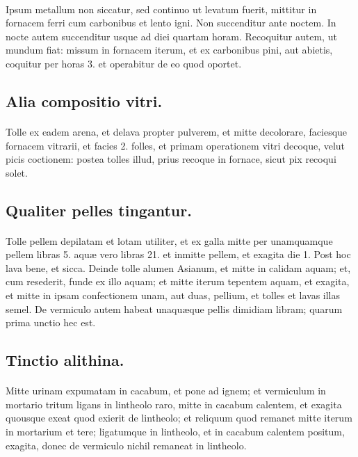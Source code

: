 \documentclass[a4paper, 11pt, oneside, polutonikogreek, italian]{article}
\begin{document}
\paragraph{}
Ipsum metallum non siccatur, sed continuo ut levatum fuerit, mittitur in fornacem ferri cum carbonibus et lento igni. Non succenditur ante noctem. In nocte autem succenditur usque ad diei quartam horam. Recoquitur autem, ut mundum fiat: missum in fornacem iterum, et ex carbonibus pini, aut abietis, coquitur per horas 3. et operabitur de eo quod oportet.

\subsection{Alia compositio vitri.}
\paragraph{}
Tolle ex eadem arena, et delava propter pulverem, et mitte decolorare, faciesque fornacem vitrarii, et facies 2. folles, et primam operationem vitri decoque, velut picis coctionem: postea tolles illud, prius recoque in fornace, sicut pix recoqui solet.

\subsection{Qualiter pelles tingantur.}
\paragraph{}
Tolle pellem depilatam et lotam utiliter, et ex galla mitte per unamquamque pellem libras 5. aquæ vero libras 21. et inmitte pellem, et exagita die 1. Post hoc lava bene, et sicca. Deinde tolle alumen Asianum, et mitte in calidam aquam; et, cum resederit, funde ex illo aquam; et mitte iterum tepentem aquam, et exagita, et mitte in ipsam confectionem unam, aut duas, pellium, et tolles et lavas illas semel. De vermiculo autem habeat unaquæque pellis dimidiam libram; quarum prima unctio hec est.

\subsection{Tinctio alithina.}
\paragraph{}
Mitte urinam expumatam in cacabum, et pone ad ignem; et vermiculum in mortario tritum ligans in lintheolo raro, mitte in cacabum calentem, et exagita quousque exeat quod exierit de lintheolo; et reliquum quod remanet mitte iterum in mortarium et tere; ligatumque in lintheolo, et in cacabum calentem positum, exagita, donec de vermiculo nichil remaneat in lintheolo.
\end{document}
